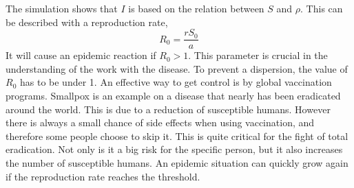 \documentclass[%
twoside,                 %
final,                   %
chapterprefix=true,      %
open=right               %
10pt]{book}
\begin{document}
The simulation shows that $I$ is based on the relation between $S$ and $\rho$. This can be described with a reproduction rate,
\begin{equation}
R_0 = \frac{rS_0}{a}
\end{equation}
It will cause an epidemic reaction if $R_0 > 1$. This parameter is crucial in the understanding of the work with the disease. To prevent a dispersion, the value of $R_0$ has to be under 1. An effective way to get control is by global vaccination programs. Smallpox is an example on a disease that nearly has been eradicated around the world. This is due to a reduction of susceptible humans. However there is always a small chance of side effects when using vaccination, and therefore some people choose to skip it. This is quite critical for the fight of total eradication. Not only is it a big risk for the specific person, but it also increases the number of susceptible humans. An epidemic situation can quickly grow again if the reproduction rate reaches the threshold.


\vspace{3mm}




\vspace{3mm}
\end{document}
